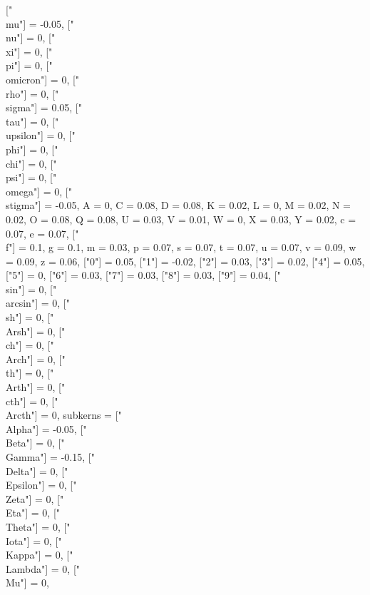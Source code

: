 {{        ["\\mu"] = -0.05, ["\\nu"] = 0, ["\\xi"] = 0,
        ["\\pi"] = 0, ["\\omicron"] = 0, ["\\rho"] = 0,
        ["\\sigma"] = 0.05, ["\\tau"] = 0, ["\\upsilon"] = 0,
        ["\\phi"] = 0, ["\\chi"] = 0, ["\\psi"] = 0,
        ["\\omega"] = 0, ["\\stigma"] = -0.05,
        A = 0, C = 0.08, D = 0.08, K = 0.02, L = 0,
        M = 0.02, N = 0.02, O = 0.08, Q = 0.08,
        U = 0.03, V = 0.01, W = 0, X = 0.03,
        Y = 0.02, c = 0.07, e = 0.07,
        ["\\f"] = 0.1, g = 0.1, m = 0.03, p = 0.07,
        s = 0.07, t = 0.07, u = 0.07, v = 0.09,
        w = 0.09, z = 0.06,
        ["0"] = 0.05, ["1"] = -0.02, ["2"] = 0.03, ["3"] = 0.02, ["4"] = 0.05,
        ["5"] = 0, ["6"] = 0.03, ["7"] = 0.03, ["8"] = 0.03, ["9"] = 0.04,
        ["\\sin"] = 0, ["\\arcsin"] = 0,
        ["\\sh"] = 0, ["\\Arsh"] = 0, ["\\ch"] = 0, ["\\Arch"] = 0,
        ["\\th"] = 0, ["\\Arth"] = 0, ["\\cth"] = 0, ["\\Arcth"] = 0,
    }
    subkerns = {
        ["\\Alpha"] = -0.05, ["\\Beta"] = 0, ["\\Gamma"] = -0.15,
        ["\\Delta"] = 0, ["\\Epsilon"] = 0, ["\\Zeta"] = 0,
        ["\\Eta"] = 0, ["\\Theta"] = 0, ["\\Iota"] = 0,
        ["\\Kappa"] = 0, ["\\Lambda"] = 0, ["\\Mu"] = 0,
}}
